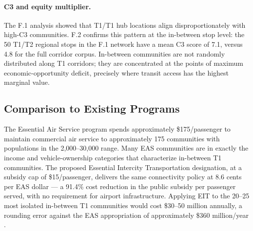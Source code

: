 \paragraph{C3 and equity multiplier.} The F.1 analysis \citep{ROUTE_F1} showed that T1/T1 hub locations align disproportionately with high-C3 communities. F.2 confirms this pattern at the in-between stop level: the 50 T1/T2 regional stops in the F.1 network have a mean C3 score of 7.1, versus 4.8 for the full corridor corpus. In-between communities are not randomly distributed along T1 corridors; they are concentrated at the points of maximum economic-opportunity deficit, precisely where transit access has the highest marginal value.

\subsection{Comparison to Existing Programs}

The Essential Air Service program spends approximately \$175/passenger \citep{EAS_DOT2023} to maintain commercial air service to approximately 175 communities with populations in the 2,000--30,000 range. Many EAS communities are in exactly the income and vehicle-ownership categories that characterize in-between T1 communities. The proposed Essential Intercity Transportation designation, at a subsidy cap of \$15/passenger, delivers the same connectivity policy at 8.6 cents per EAS dollar --- a 91.4\% cost reduction in the public subsidy per passenger served, with no requirement for airport infrastructure. Applying EIT to the 20--25 most isolated in-between T1 communities would cost \$30--50 million annually, a rounding error against the EAS appropriation of approximately \$360 million/year \citep{EAS_DOT2023}.

